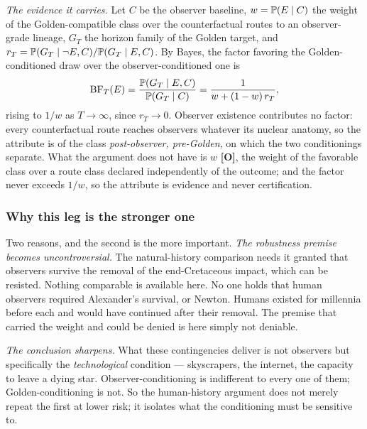 \emph{The evidence it carries.} Let $C$ be the observer baseline,
$w=\mathbb{P}(E\mid C)$ the weight of the Golden-compatible class over the
counterfactual routes to an observer-grade lineage, $G_T$ the horizon
family of the Golden target, and
$r_T=\mathbb{P}(G_T\mid\neg E,C)/\mathbb{P}(G_T\mid E,C)$. By Bayes, the factor
favoring the Golden-conditioned draw over the observer-conditioned one is
\[
\mathrm{BF}_T(E)=\frac{\mathbb{P}(G_T\mid E,C)}{\mathbb{P}(G_T\mid C)}=\frac{1}{w+(1-w)\,r_T},
\]
rising to $1/w$ as $T\to\infty$, since $r_T\to0$. Observer existence
contributes no factor: every counterfactual route reaches observers
whatever its nuclear anatomy, so the attribute is of the class
\emph{post-observer, pre-Golden}, on which the two conditionings
separate. What the argument does not have is $w$ \textbf{[O]}, the weight
of the favorable class over a route class declared independently of the
outcome; and the factor never exceeds $1/w$, so the attribute is evidence
and never certification.


\subsubsection{Why this leg is the stronger one}
\label{gc:subsub:strongerleg}

Two reasons, and the second is the more important. \emph{The robustness premise becomes uncontroversial.} The natural-history
comparison needs it granted that observers survive the removal of the
end-Cretaceous impact, which can be resisted. Nothing comparable is
available here. No one holds that human observers required Alexander's
survival, or Newton. Humans existed for
millennia before each and would have continued after their removal. The
premise that carried the weight and could be denied is here simply not
deniable.

\emph{The conclusion sharpens.} What these contingencies deliver is not
observers but specifically the \emph{technological} condition ---
skyscrapers, the internet, the capacity to leave a dying star.
Observer-conditioning is indifferent to every one of them;
Golden-conditioning is not. So the human-history argument does not merely repeat
the first at lower risk; it isolates what the conditioning must be
sensitive to.

